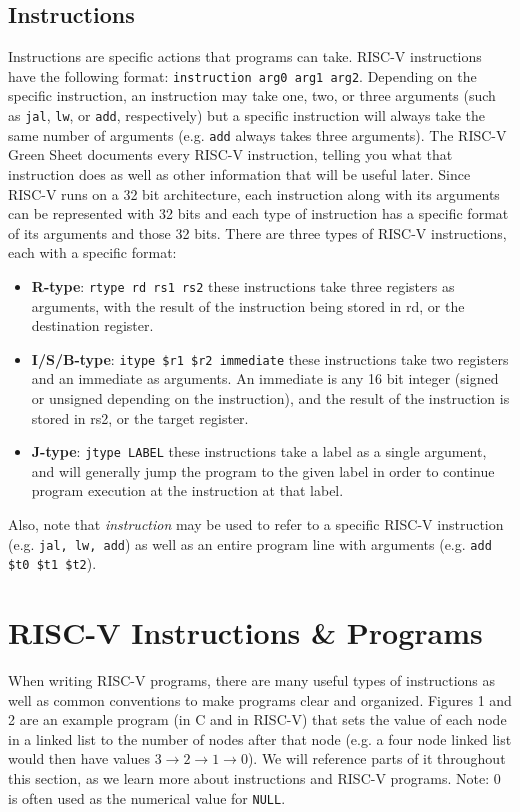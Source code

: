 \documentclass{article}
\begin{document}
\subsection{Instructions}
Instructions are specific actions that programs can take. RISC-V instructions have the following format: \texttt{instruction arg0 arg1 arg2}. Depending on the specific instruction, an instruction may take one, two, or three arguments (such as \texttt{jal},  \texttt{lw}, or \texttt{add}, respectively) but a specific instruction will always take the same number of arguments (e.g.  \texttt{add} always takes three arguments). The RISC-V Green Sheet documents every RISC-V instruction, telling you what that instruction does as well as other information that will be useful later. Since RISC-V runs on a 32 bit architecture, each instruction along with its arguments can be represented with 32 bits and each type of instruction has a specific format of its arguments and those 32 bits. There are three types of RISC-V instructions, each with a specific format:

\begin{itemize}
\item \textbf{R-type}: \texttt{rtype rd rs1 rs2} these instructions take three registers as arguments, with the result of the instruction being stored in rd, or the destination register.
\item \textbf{I/S/B-type}: \texttt{itype \$r1 \$r2 immediate} these instructions take two registers and an immediate as arguments. An immediate is any 16 bit integer (signed or unsigned depending on the instruction), and the result of the instruction is stored in rs2, or the target register.
\item \textbf{J-type}: \texttt{jtype LABEL} these instructions take a label as a single argument, and will generally jump the program to the given label in order to continue program execution at the instruction at that label.
\end{itemize}

Also, note that \textit{instruction} may be used to refer to a specific RISC-V instruction (e.g. \texttt{jal, lw, add}) as well as an entire program line with arguments (e.g. \texttt{add \$t0 \$t1 \$t2}).


\section{RISC-V Instructions \& Programs}
When writing RISC-V programs, there are many useful types of instructions as well as common conventions to make programs clear and organized. Figures 1 and 2 are an example program (in C and in RISC-V) that sets the value of each node in a linked list to the number of nodes after that node (e.g. a four node linked list would then have values $3\rightarrow2\rightarrow1\rightarrow0$). We will reference parts of it throughout this section, as we learn more about instructions and RISC-V programs. Note: $0$ is often used as the numerical value for \texttt{NULL}.
\end{document}
